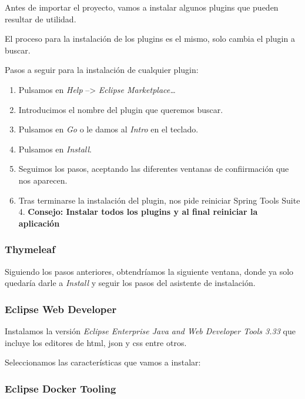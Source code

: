 Antes de importar el proyecto, vamos a instalar algunos plugins que pueden resultar de utilidad.

El proceso para la instalación de los plugins es el mismo, solo cambia el plugin a buscar.

Pasos a seguir para la instalación de cualquier plugin:
\begin{enumerate}
	\item Pulsamos en \textit{Help} --> \textit{Eclipse Marketplace\dots}
	\item Introducimos el nombre del plugin que queremos buscar.
	\item Pulsamos en \textit{Go} o le damos al \textit{Intro} en el teclado.
	\item Pulsamos en \textit{Install}.
	\item Seguimos los pasos, aceptando las diferentes ventanas de confiirmación que nos aparecen.
	\item Tras terminarse la instalación del plugin, nos pide reiniciar Spring Tools Suite 4. \textbf{Consejo: Instalar todos los plugins y al final reiniciar la aplicación}
\end{enumerate}

\subsubsection{Thymeleaf}

Siguiendo los pasos anteriores, obtendríamos la siguiente ventana, donde ya solo quedaría darle a \textit{Install} y seguir los pasos del asistente de instalación.

\subsubsection{Eclipse Web Developer}

Instalamos la versión \textit{Eclipse Enterprise Java and Web Developer Tools 3.33} que incluye los editores de html, json y css entre otros.

Seleccionamos las características que vamos a instalar:


\subsubsection{Eclipse Docker Tooling}


